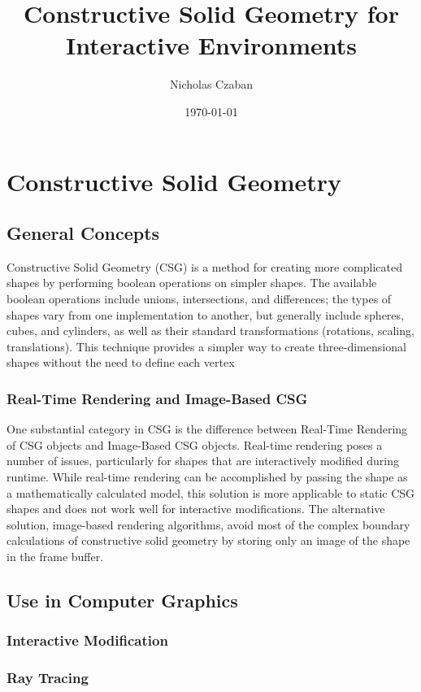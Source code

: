 \documentclass[12pt]{article}
\begin{document}
\title{Constructive Solid Geometry for Interactive Environments}
\author{Nicholas Czaban}
\date{\today}
\maketitle

\section{Constructive Solid Geometry}
\subsection{General Concepts}
Constructive Solid Geometry (CSG) is a method for creating more complicated shapes by performing boolean operations on simpler shapes. The available boolean operations include unions, intersections, and differences; the types of shapes vary from one implementation to another, but generally include spheres, cubes, and cylinders, as well as their standard transformations (rotations, scaling, translations)\cite{cs_dictionary}. This technique provides a simpler way to create three-dimensional shapes without the need to define each vertex
\subsubsection{Real-Time Rendering and Image-Based CSG}
One substantial category in CSG is the difference between Real-Time Rendering of CSG objects and Image-Based CSG objects. Real-time rendering poses a number of issues, particularly for shapes that are interactively modified during runtime. While real-time rendering can be accomplished by passing the shape as a mathematically calculated model, this solution is more applicable to static CSG shapes and does not work well for interactive modifications\cite{open_csg}. The alternative solution, image-based rendering algorithms, avoid most of the complex boundary calculations of constructive solid geometry by storing only an image of the shape in the frame buffer\cite{open_csg}. 
\subsection{Use in Computer Graphics}
\subsubsection{Interactive Modification}
\subsubsection{Ray Tracing}
\end{document}
